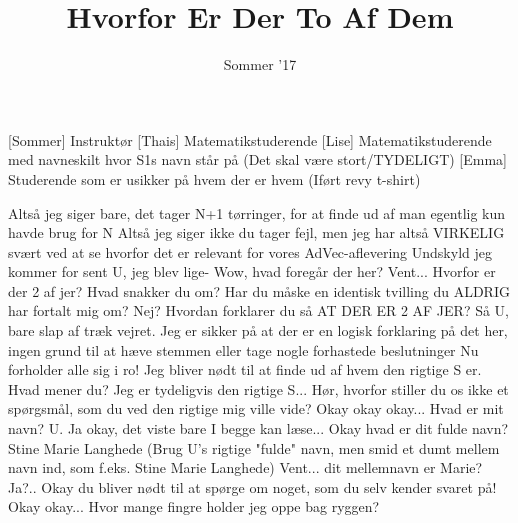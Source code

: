 \documentclass[a4paper,11pt]{article}
\title{Hvorfor Er Der To Af Dem}
\author{Sommer '17}
\begin{document}
\maketitle

\begin{roles}
[Sommer] Instruktør
[Thais] Matematikstuderende
[Lise] Matematikstuderende med navneskilt hvor S1s navn står på (Det skal være stort/TYDELIGT)
[Emma] Studerende som er usikker på hvem der er hvem (Iført revy t-shirt)
\end{roles}

\begin{sketch}
 Altså jeg siger bare, det tager N+1 tørringer, for at finde ud af man egentlig kun havde brug for N
 Altså jeg siger ikke du tager fejl, men jeg har altså VIRKELIG svært ved at se hvorfor det er relevant for vores AdVec-aflevering
 Undskyld jeg kommer for sent U, jeg blev lige- 
 Wow, hvad foregår der her?
  Vent... Hvorfor er der 2 af jer?
 Hvad snakker du om?
 Har du måske en identisk tvilling du ALDRIG har fortalt mig om?
 Nej?
 Hvordan forklarer du så  AT DER ER 2 AF JER?
 Så U, bare slap af træk vejret. Jeg er sikker på at der er en logisk forklaring på det her, ingen grund til at hæve stemmen eller tage nogle forhastede beslutninger
 Nu forholder alle sig i ro! Jeg bliver nødt til at finde ud af hvem den rigtige S er.
 Hvad mener du? Jeg er tydeligvis den rigtige S... Hør, hvorfor stiller du os ikke et spørgsmål, som du ved den rigtige mig ville vide?
 Okay okay okay... Hvad er mit navn?
 U. 
 Ja okay, det viste bare I begge kan læse... Okay hvad er dit fulde navn?
 Stine Marie Langhede (Brug U's rigtige "fulde" navn, men smid et dumt mellem navn ind, som f.eks. Stine Marie Langhede)
 Vent... dit mellemnavn er Marie?
  Ja?.. 
 Okay du bliver nødt til at spørge om noget, som du selv kender svaret på!
Okay okay...  Hvor mange fingre holder jeg oppe bag ryggen?

\end{sketch}
\end{document}
